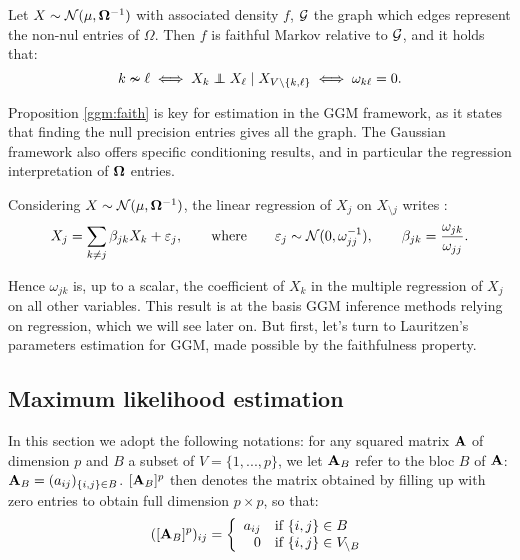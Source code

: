 \begin{prop}\label{ggm:faith}
 Let $X\sim \mathcal{N}(\mu, {\boldsymbol{\Omega}}^{-1})$ with associated density $f$, $\mathcal{G}$ the graph which edges represent the non-nul entries of $\Omega$. Then $f$ is faithful Markov relative to $\mathcal{G}$,  and it holds that:
 $$k\nsim \ell \iff  X_k \independent X_\ell \mid X_{V\setminus\{k,\ell\}} \iff \omega_{k\ell}=0.$$
\end{prop} 

Proposition \ref{ggm:faith} is key for estimation in the GGM framework, as it states that finding the null precision entries gives all the graph. The Gaussian framework also offers specific conditioning results, and in particular the regression interpretation of ${\boldsymbol{\Omega}}$ entries.

\begin{prop}
 Considering $X\sim \mathcal{N}(\mu, {\boldsymbol{\Omega}}^{-1})$, the linear regression of  $X_j$ on $X_{\setminus j}$ writes :
$$X_j = \sum_{k\neq j} \beta_{jk} X_k + \varepsilon_j,\qquad \text{where}\qquad\varepsilon_j \sim \mathcal{N} (0, \omega_{jj}^{-1}), \qquad \beta_{jk} = \frac{\omega_{jk}}{\omega_{jj}}.$$

\end{prop}
Hence $\omega_{jk}$ is, up to a scalar, the coefficient of $X_k$ in the multiple regression of $X_j$ on all other variables. This result is at the basis GGM inference methods relying on regression, which we will see later on. But first, let's turn to Lauritzen's  parameters estimation for GGM, made possible by the faithfulness property.

 \subsection{Maximum likelihood estimation}
In this section we adopt the following notations: for any  squared  matrix ${\bf A}$ of dimension $p$ and $B$ a subset of $V=\{1,...,p\}$, we let ${\bf A}_B$ refer to the bloc $B$ of ${\bf A}$: ${\bf A}_{B}=(a_{ij})_{\{i,j\}\in B}$.   $[{\bf A}_B]^p$ then denotes the matrix obtained by filling up with zero entries to obtain full dimension $p\times p$, so that:
$$([{\bf A}_B]^p )_{ij}=\left\{ \begin{array}{rl}
a_{ij} & \text{if } \{i,j\}\in B\\
0 &  \text{if } \{i,j\}\in V_{\setminus B}
\end{array}\right.$$

